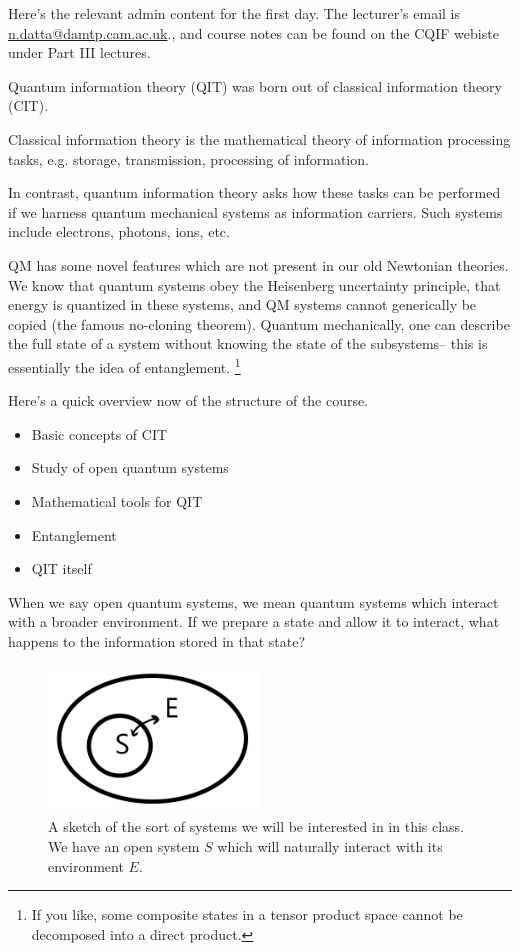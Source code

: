 \begin{note}
    Here's the relevant admin content for the first day. The lecturer's email is \url{n.datta@damtp.cam.ac.uk}., and course notes can be found on the CQIF webiste under Part III lectures.
\end{note}

Quantum information theory (QIT) was born out of classical information theory (CIT).
\begin{defn}
Classical information theory is the mathematical theory of information processing tasks, e.g. storage, transmission, processing of information.
\end{defn}
In contrast, quantum information theory asks how these tasks can be performed if we harness quantum mechanical systems as information carriers. Such systems include electrons, photons, ions, etc.

QM has some novel features which are not present in our old Newtonian theories. We know that quantum systems obey the Heisenberg uncertainty principle, that energy is quantized in these systems, and QM systems cannot generically be copied (the famous no-cloning theorem).
Quantum mechanically, one can describe the full state of a system without knowing the state of the subsystems-- this is essentially the idea of entanglement.%
    \footnote{If you like, some composite states in a tensor product space cannot be decomposed into a direct product.}

Here's a quick overview now of the structure of the course.
\begin{itemize}
    \item Basic concepts of CIT
    \item Study of open quantum systems
    \item Mathematical tools for QIT
    \item Entanglement
    \item QIT itself
\end{itemize}
When we say open quantum systems, we mean quantum systems which interact with a broader environment. If we prepare a state and allow it to interact, what happens to the information stored in that state?

\begin{figure}
    \centering
    \includegraphics[width=0.5\textwidth]{2019/01/20190118_opensystem.png}
    \caption{A sketch of the sort of systems we will be interested in in this class. We have an open system $S$ which will naturally interact with its environment $E$.}
    \label{fig:opensystem}
\end{figure}
